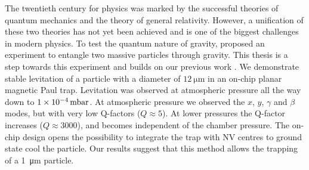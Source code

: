 The twentieth century for physics was marked by the successful theories of quantum mechanics and the theory of general relativity. However, a unification of these two theories has not yet been achieved and is one of the biggest challenges in modern physics. To test the quantum nature of gravity, \citeauthor{bose_spin_2017} proposed an experiment to entangle two massive particles through gravity\cite{bose_spin_2017}. This thesis is a step towards this experiment and builds on our previous work \cite{janse_characterization_2024,eli,mart}. We demonstrate stable levitation of a  particle with a diameter of $\qty{12}{\micro\meter}$ in an on-chip planar magnetic Paul trap. Levitation was observed at atmospheric pressure all the way down to $\qty{1E-4}{\milli\bar}$. At atmospheric pressure we observed the $x$, $y$, $\gamma$ and $\beta$ modes, but with very low Q-factors ($Q \approx 5$). At lower pressures the Q-factor increases ($Q \approx 3000$), and becomes independent of the chamber pressure. The on-chip design opens the possibility to integrate the trap with NV centres to ground state cool the particle. Our results suggest that this method allows the trapping of a \qty{1}{\micro\meter} particle.
